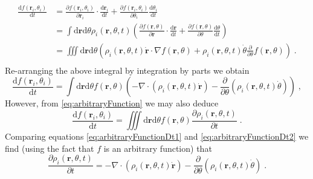 \documentclass{article}
\begin{document}
\begin{equation}
    \begin{aligned}
        \frac{\mathrm{d}f\left( \mathbf{r}_i,\theta _i \right)}{\mathrm{d}t}&=\frac{\partial f\left( \mathbf{r}_i,\theta _i \right)}{\partial \mathbf{r}_i}\cdot \frac{\mathrm{d}\mathbf{r}_i}{\mathrm{d}t}+\frac{\partial f\left( \mathbf{r}_i,\theta _i \right)}{\partial \theta _i}\frac{\mathrm{d}\theta _i}{\mathrm{d}t}\\
        &=\int{\mathrm{d}\mathbf{r}\mathrm{d}\theta \rho _i\left( \mathbf{r},\theta ,t \right) \left( \frac{\partial f\left( \mathbf{r},\theta \right)}{\partial \mathbf{r}}\cdot \frac{\mathrm{d}\mathbf{r}}{\mathrm{d}t}+\frac{\partial f\left( \mathbf{r},\theta \right)}{\partial \theta}\frac{\mathrm{d}\theta}{\mathrm{d}t} \right)}\\
        &=\iiint{\mathrm{d}\mathbf{r}\mathrm{d}\theta \left( \rho _i\left( \mathbf{r},\theta ,t \right) \dot{\mathbf{r}}\cdot \nabla f\left( \mathbf{r},\theta \right) +\rho _i\left( \mathbf{r},\theta ,t \right) \dot{\theta}\frac{\partial}{\partial \theta}f\left( \mathbf{r},\theta \right) \right) \;.}\\
    \end{aligned}
\end{equation}
Re-arranging the above integral by integration by parts we obtain
\begin{equation}
    \label{eq:arbitraryFunctionDt1}
    \frac{\mathrm{d}f\left( \mathbf{r}_i,\theta _i \right)}{\mathrm{d}t}=\int{\mathrm{d}\mathbf{r}\mathrm{d}\theta f\left( \mathbf{r},\theta \right) \left( -\nabla \cdot \left( \rho _i\left( \mathbf{r},\theta ,t \right) \dot{\mathbf{r}} \right) -\frac{\partial}{\partial \theta}\left( \rho _i\left( \mathbf{r},\theta ,t \right) \dot{\theta} \right) \right)}\;,
\end{equation}
However, from \eqref{eq:arbitraryFunction} we may also deduce
\begin{equation}
    \label{eq:arbitraryFunctionDt2}
    \frac{\mathrm{d}f\left( \mathbf{r}_i,\theta _i \right)}{\mathrm{d}t}=\iiint{\mathrm{d}\mathbf{r}\mathrm{d}\theta f\left( \mathbf{r},\theta \right) \frac{\partial \rho _i\left( \mathbf{r},\theta ,t \right)}{\partial t}}\;.
\end{equation}
Comparing equations \eqref{eq:arbitraryFunctionDt1} and \eqref{eq:arbitraryFunctionDt2} we find (using the fact that $f$ is an arbitrary function) that
\begin{equation}
    \label{eq:continuityEquation}
    \frac{\partial \rho _i\left( \mathbf{r},\theta ,t \right)}{\partial t}=-\nabla \cdot \left( \rho _i\left( \mathbf{r},\theta ,t \right) \dot{\mathbf{r}} \right) -\frac{\partial}{\partial \theta}\left( \rho _i\left( \mathbf{r},\theta ,t \right) \dot{\theta} \right) \;.
\end{equation}
\end{document}
